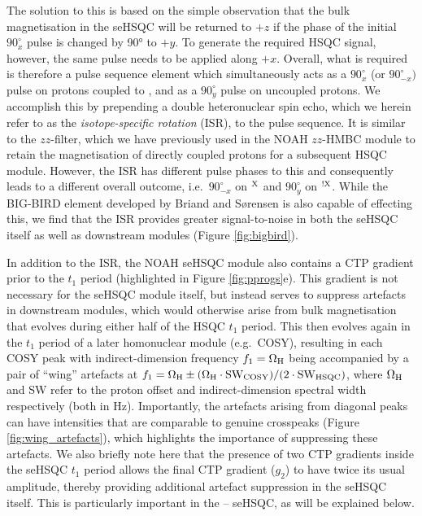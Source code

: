 \documentclass[11pt]{article}
\newcommand*{\hl}[1]{\textcolor{WildStrawberry}{#1}}
\newcommand*{\carbon}{\ce{^{13}C}}
\newcommand*{\proton}{\ce{^{1}H}}
\newcommand*{\nitrogen}{\ce{^{15}N}}
\newcommand*{\magn}[1]{\ce{^1H}$^{#1}$}
\newcommand*{\magnnot}[1]{\ce{^1H}$^{!#1}$}
\newcommand*{\figref}[1]{Figure \ref{fig:#1}}
\begin{document}
The solution to this is based on the simple observation that the bulk magnetisation in the seHSQC will be returned to $+z$ if the phase of the initial \proton{} $90^\circ_{x}$ pulse is changed by \ang{90} to $+y$.
To generate the required HSQC signal, however, the same pulse needs to be applied along $+x$.
Overall, what is required is therefore a pulse sequence element which simultaneously acts as a $90^\circ_x$ (or $90^\circ_{-x})$ pulse on protons coupled to \carbon{}, and as a $90^\circ_y$ pulse on uncoupled protons.
We accomplish this by prepending a double heteronuclear spin echo, which we herein refer to as the \textit{isotope-specific rotation} (ISR), to the pulse sequence.
It is similar to the $zz$-filter, which we have previously used in the NOAH $zz$-HMBC module to retain the magnetisation of directly coupled protons for a subsequent HSQC module.\autocite{Kupce2018CC, Kupce2019JMR}
However, the ISR has different pulse phases to this and consequently leads to a different overall outcome, i.e.\ $90^\circ_{-x}$ on \magn{\ce{X}} and $90^\circ_y$ on \magnnot{\ce{X}}.
While the BIG-BIRD element developed by Briand and S{\o}rensen\autocite{Briand1997JMR} is also capable of effecting this, we find that the ISR provides greater signal-to-noise in both the seHSQC itself as well as downstream modules (\figref{bigbird}).

In addition to the ISR, the NOAH seHSQC module also contains a CTP gradient prior to the $t_1$ period (highlighted in \figref{pprogs}e).
This gradient is not necessary for the seHSQC module itself, but instead serves to suppress artefacts in downstream modules, which would otherwise arise from bulk magnetisation that evolves during either half of the HSQC $t_1$ period.
This then evolves again in the $t_1$ period of a later homonuclear module (e.g.\ COSY), resulting in each COSY peak with \hl{indirect-dimension frequency $f_1 = \Omega_{\ce{H}}$ being accompanied by a pair of ``wing'' artefacts at $f_1 = \Omega_{\ce{H}} \pm (\Omega_{\ce{H}}\cdot\mathrm{SW_{COSY}})/(2\cdot \mathrm{SW_{HSQC}})$, where $\Omega_{\ce{H}}$ and SW refer to the proton offset and indirect-dimension spectral width respectively (both in Hz).}
Importantly, the artefacts arising from diagonal peaks can have intensities that are comparable to genuine crosspeaks (\figref{wing_artefacts}), which highlights the importance of suppressing these artefacts.
\hl{We also briefly note here that the presence of two CTP gradients inside the seHSQC $t_1$ period allows the final CTP gradient ($g_2$) to have twice its usual amplitude, thereby providing additional artefact suppression in the seHSQC itself.
This is particularly important in the \nitrogen{}--\proton{} seHSQC, as will be explained below.}
\end{document}
